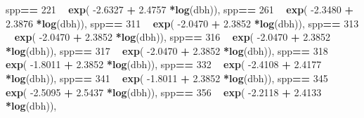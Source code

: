 \documentclass[
]{article}
\newenvironment{Shaded}{\begin{snugshade}}{\end{snugshade}}
\newcommand{\DecValTok}[1]{\textcolor[rgb]{0.00,0.00,0.81}{#1}}
\newcommand{\FloatTok}[1]{\textcolor[rgb]{0.00,0.00,0.81}{#1}}
\newcommand{\KeywordTok}[1]{\textcolor[rgb]{0.13,0.29,0.53}{\textbf{#1}}}
\newcommand{\NormalTok}[1]{#1}
\newcommand{\OperatorTok}[1]{\textcolor[rgb]{0.81,0.36,0.00}{\textbf{#1}}}
\newcommand{\StringTok}[1]{\textcolor[rgb]{0.31,0.60,0.02}{#1}}
\begin{document}
\begin{Shaded}
\begin{Highlighting}[]
\NormalTok{    spp}\OperatorTok{==}\StringTok{ }\DecValTok{221} \OperatorTok{~}\StringTok{ }\KeywordTok{exp}\NormalTok{( }\FloatTok{-2.6327}   \OperatorTok{+}\StringTok{    }\FloatTok{2.4757} \OperatorTok{*}\KeywordTok{log}\NormalTok{(dbh)),}
\NormalTok{    spp}\OperatorTok{==}\StringTok{ }\DecValTok{261} \OperatorTok{~}\StringTok{ }\KeywordTok{exp}\NormalTok{( }\FloatTok{-2.3480}   \OperatorTok{+}\StringTok{    }\FloatTok{2.3876} \OperatorTok{*}\KeywordTok{log}\NormalTok{(dbh)),}
\NormalTok{    spp}\OperatorTok{==}\StringTok{ }\DecValTok{311} \OperatorTok{~}\StringTok{ }\KeywordTok{exp}\NormalTok{( }\FloatTok{-2.0470}   \OperatorTok{+}\StringTok{    }\FloatTok{2.3852} \OperatorTok{*}\KeywordTok{log}\NormalTok{(dbh)),}
\NormalTok{    spp}\OperatorTok{==}\StringTok{ }\DecValTok{313} \OperatorTok{~}\StringTok{ }\KeywordTok{exp}\NormalTok{( }\FloatTok{-2.0470}   \OperatorTok{+}\StringTok{    }\FloatTok{2.3852} \OperatorTok{*}\KeywordTok{log}\NormalTok{(dbh)),}
\NormalTok{    spp}\OperatorTok{==}\StringTok{ }\DecValTok{316} \OperatorTok{~}\StringTok{ }\KeywordTok{exp}\NormalTok{( }\FloatTok{-2.0470}   \OperatorTok{+}\StringTok{    }\FloatTok{2.3852} \OperatorTok{*}\KeywordTok{log}\NormalTok{(dbh)),}
\NormalTok{    spp}\OperatorTok{==}\StringTok{ }\DecValTok{317} \OperatorTok{~}\StringTok{ }\KeywordTok{exp}\NormalTok{( }\FloatTok{-2.0470}   \OperatorTok{+}\StringTok{    }\FloatTok{2.3852} \OperatorTok{*}\KeywordTok{log}\NormalTok{(dbh)),}
\NormalTok{    spp}\OperatorTok{==}\StringTok{ }\DecValTok{318} \OperatorTok{~}\StringTok{ }\KeywordTok{exp}\NormalTok{( }\FloatTok{-1.8011}   \OperatorTok{+}\StringTok{    }\FloatTok{2.3852} \OperatorTok{*}\KeywordTok{log}\NormalTok{(dbh)),}
\NormalTok{    spp}\OperatorTok{==}\StringTok{ }\DecValTok{332} \OperatorTok{~}\StringTok{ }\KeywordTok{exp}\NormalTok{( }\FloatTok{-2.4108}   \OperatorTok{+}\StringTok{    }\FloatTok{2.4177} \OperatorTok{*}\KeywordTok{log}\NormalTok{(dbh)),}
\NormalTok{    spp}\OperatorTok{==}\StringTok{ }\DecValTok{341} \OperatorTok{~}\StringTok{ }\KeywordTok{exp}\NormalTok{( }\FloatTok{-1.8011}   \OperatorTok{+}\StringTok{    }\FloatTok{2.3852} \OperatorTok{*}\KeywordTok{log}\NormalTok{(dbh)),}
\NormalTok{    spp}\OperatorTok{==}\StringTok{ }\DecValTok{345} \OperatorTok{~}\StringTok{ }\KeywordTok{exp}\NormalTok{( }\FloatTok{-2.5095}   \OperatorTok{+}\StringTok{    }\FloatTok{2.5437} \OperatorTok{*}\KeywordTok{log}\NormalTok{(dbh)),}
\NormalTok{    spp}\OperatorTok{==}\StringTok{ }\DecValTok{356} \OperatorTok{~}\StringTok{ }\KeywordTok{exp}\NormalTok{( }\FloatTok{-2.2118}   \OperatorTok{+}\StringTok{    }\FloatTok{2.4133} \OperatorTok{*}\KeywordTok{log}\NormalTok{(dbh)), }

\end{Highlighting}
\end{Shaded}
\end{document}
